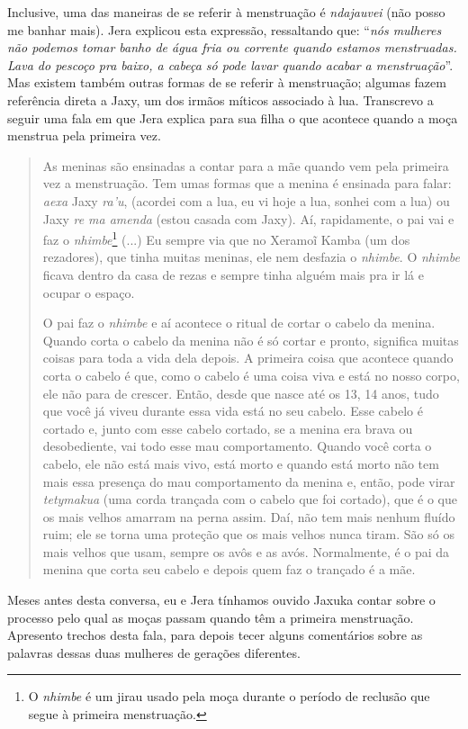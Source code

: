 Inclusive, uma das maneiras de se referir à menstruação é
\emph{ndajauvei} (não posso me banhar mais). Jera explicou esta
expressão, ressaltando que: ``\emph{nós mulheres não podemos tomar banho
de água fria ou corrente quando estamos menstruadas. Lava do pescoço pra
baixo, a cabeça só pode lavar quando acabar a menstruação}''. Mas
existem também outras formas de se referir à menstruação; algumas fazem
referência direta a Jaxy, um dos irmãos míticos associado à lua.
Transcrevo a seguir uma fala em que Jera explica para sua filha o que
acontece quando a moça menstrua pela primeira vez.

\begin{quote}
As meninas são ensinadas a contar para a mãe quando vem pela primeira
vez a menstruação. Tem umas formas que a menina é ensinada para falar:
\emph{aexa} Jaxy \emph{ra'u}, (acordei com a lua, eu vi hoje a lua,
sonhei com a lua) ou Jaxy \emph{re ma amenda} (estou casada com Jaxy).
Aí, rapidamente, o pai vai e faz o \emph{nhimbe}\footnote{O
  \emph{nhimbe} é um jirau usado pela moça durante o período de reclusão
  que segue à primeira menstruação.} (...) Eu sempre via que no Xeramoĩ
Kamba (um dos rezadores), que tinha muitas meninas, ele nem desfazia o
\emph{nhimbe}. O \emph{nhimbe} ficava dentro da casa de rezas e sempre
tinha alguém mais pra ir lá e ocupar o espaço.

O pai faz o \emph{nhimbe} e aí acontece o ritual de cortar o cabelo da
menina. Quando corta o cabelo da menina não é só cortar e pronto,
significa muitas coisas para toda a vida dela depois. A primeira coisa
que acontece quando corta o cabelo é que, como o cabelo é uma coisa viva
e está no nosso corpo, ele não para de crescer. Então, desde que nasce
até os 13, 14 anos, tudo que você já viveu durante essa vida está no seu
cabelo. Esse cabelo é cortado e, junto com esse cabelo cortado, se a
menina era brava ou desobediente, vai todo esse mau comportamento.
Quando você corta o cabelo, ele não está mais vivo, está morto e quando
está morto não tem mais essa presença do mau comportamento da menina e,
então, pode virar \emph{tetymakua} (uma corda trançada com o cabelo que
foi cortado), que é o que os mais velhos amarram na perna assim. Daí,
não tem mais nenhum fluído ruim; ele se torna uma proteção que os mais
velhos nunca tiram. São só os mais velhos que usam, sempre os avôs e as
avós. Normalmente, é o pai da menina que corta seu cabelo e depois quem
faz o trançado é a mãe.
\end{quote}

Meses antes desta conversa, eu e Jera tínhamos ouvido Jaxuka contar
sobre o processo pelo qual as moças passam quando têm a primeira
menstruação. Apresento trechos desta fala, para depois tecer alguns
comentários sobre as palavras dessas duas mulheres de gerações
diferentes.


